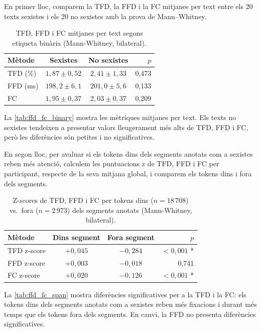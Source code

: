 En primer lloc, comparem la TFD, la FFD i la FC mitjanes per text entre els 20 texts sexistes i els 20 no sexistes amb la prova de Mann--Whitney.
\iftables
\begin{table}[htbp]
\small
\centering
\begin{tabular}{lccr}
\toprule
\textbf{Mètode} & \textbf{Sexistes} & \textbf{No sexistes} & \textbf{$p$} \\
\midrule
TFD (\%) & $1,87 \pm 0,52$ & $2,41 \pm 1,33$ & 0,473 \\
FFD (ms) & $198,2 \pm 6,1$ & $201,0 \pm 5,6$ & 0,133 \\
FC       & $1,95 \pm 0,37$  & $2,03 \pm 0,37$  & 0,209 \\
\bottomrule
\end{tabular}
\caption{TFD, FFD i FC mitjanes per text segons etiqueta binària (Mann-Whitney, bilateral).}
\label{tab:ffd_fc_binary}
\end{table}
\fi
La \autoref{tab:ffd_fc_binary} mostra les mètriques mitjanes per text.
Els texts no sexistes tendeixen a presentar valors lleugerament més alts de TFD, FFD i FC, però les diferències són petites i no significatives.

En segon lloc, per avaluar si els tokens dins dels segments anotats com a sexistes reben més atenció, calculem les puntuacions z de TFD, FFD i FC per participant, respecte de la seva mitjana global, i comparem els tokens dins i fora dels segments.
\iftables
\begin{table}[htbp]
\small
\centering
\begin{tabular}{lccr}
\toprule
\textbf{Mètode} & \textbf{Dins segment} & \textbf{Fora segment} & \textbf{$p$} \\
\midrule
TFD z-score & $+0,045$ & $-0,284$ & $< 0,001$ * \\
FFD z-score & $+0,003$ & $-0,018$ & \hphantom{$<$} 0,741 \hphantom{*} \\
FC z-score  & $+0,020$ & $-0,126$ & $< 0,001$ * \\
\bottomrule
\end{tabular}
    \caption{Z-scores de TFD, FFD i FC per tokens dins ($n = 18\,708$) vs.\ fora ($n = 2\,973$) dels segments anotats (Mann-Whitney, bilateral).}
\label{tab:ffd_fc_span}
\end{table}
\fi
La \autoref{tab:ffd_fc_span} mostra diferències significatives per a la TFD i la FC: els tokens dins dels segments anotats com a sexistes reben més fixacions i durant més temps que els tokens fora dels segments.
En canvi, la FFD no presenta diferències significatives.

